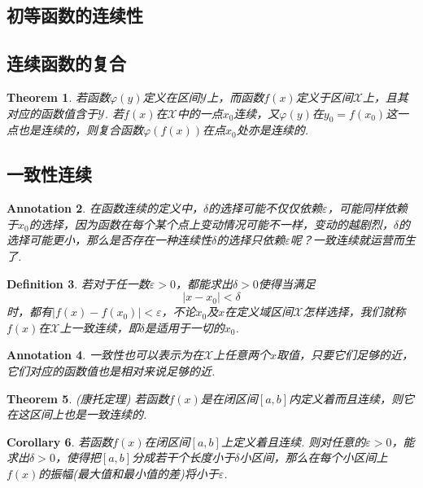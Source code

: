 \documentclass{article}
\newtheorem{theorem}{Theorem}[section]
\newtheorem{corollary}[theorem]{Corollary}
\newtheorem{definition}[theorem]{Definition}
\newtheorem{annotation}[theorem]{Annotation}
\begin{document}
\subsection{初等函数的连续性}

\subsection{连续函数的复合}

\begin{theorem}
若函数$\varphi(y)$定义在区间$\mathcal{Y}$上，而函数$f(x)$定义于区间$\mathcal{X}$上，且其对应的函数值含于$\mathcal{Y}$. 若$f(x)$在$\mathcal{X}$中的一点$x_0$连续，又$\varphi(y)$在$y_0 = f(x_0)$这一点也是连续的，则复合函数$\varphi(f(x))$在点$x_0$处亦是连续的.
\end{theorem}

\subsection{一致性连续}

\begin{annotation}
\rm 在函数连续的定义中，$\delta$的选择可能不仅仅依赖$\varepsilon$，可能同样依赖于$x_0$的选择，因为函数在每个某个点上变动情况可能不一样，变动的越剧烈，$\delta$的选择可能更小，那么是否存在一种连续性$\delta$的选择只依赖$\varepsilon$呢？一致连续就运营而生了.
\end{annotation}

\begin{definition}
\rm 若对于任一数$\varepsilon > 0$，都能求出$\delta > 0$使得当满足
$$
|x-x_0| < \delta
$$
时，都有$|f(x)-f(x_0)| < \varepsilon$，不论$x_0$及$x$在定义域区间$\mathcal{X}$怎样选择，我们就称$f(x)$在$\mathcal{X}$上{\color{red}一致连续}，即$\delta$是适用于一切的$x_0$.
\end{definition}

\begin{annotation}
\rm 一致性也可以表示为在$\mathcal{X}$上任意两个$x$取值，只要它们足够的近，它们对应的函数值也是相对来说足够的近. 
\end{annotation}

\begin{theorem}
\rm {\color{red} (康托定理) }若函数$f(x)$是在闭区间$[a,b]$内定义着而且连续，则它在这区间上也是一致连续的.
\end{theorem}

\begin{corollary}
\rm 若函数$f(x)$在闭区间$[a,b]$上定义着且连续. 则对任意的$\varepsilon > 0$，能求出$\delta > 0$，使得把$[a,b]$分成若干个长度小于$\delta$小区间，那么在每个小区间上$f(x)$的振幅(最大值和最小值的差)将小于$\varepsilon$.
\end{corollary}
\end{document}
